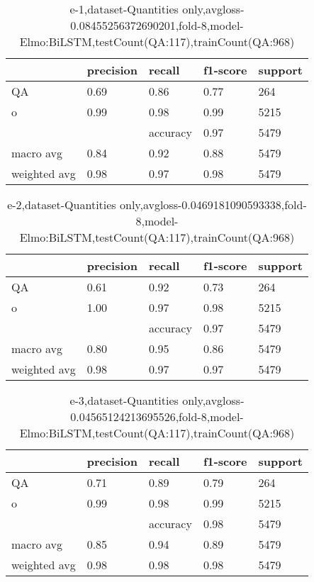 \begin{table}[!ht] 
\centering
\caption{e-1,dataset-Quantities only,avgloss-0.08455256372690201,fold-8,model-Elmo:BiLSTM,testCount(QA:117),trainCount(QA:968)}\label{e-1data-quantS.tsv}
\begin{tabularx}{300pt}{|X|X|X|X|X|}
\hline
&precision&recall&f1-score&support\\
\hline
QA&0.69&0.86&0.77&264\\
\hline
o&0.99&0.98&0.99&5215\\
\hline
&&accuracy&0.97&5479\\
\hline
macro avg&0.84&0.92&0.88&5479\\
\hline
weighted avg&0.98&0.97&0.98&5479\\
\hline
\end{tabularx}
\end{table}
\begin{table}[!ht] 
\centering
\caption{e-2,dataset-Quantities only,avgloss-0.0469181090593338,fold-8,model-Elmo:BiLSTM,testCount(QA:117),trainCount(QA:968)}\label{e-2data-quantS.tsv}
\begin{tabularx}{300pt}{|X|X|X|X|X|}
\hline
&precision&recall&f1-score&support\\
\hline
QA&0.61&0.92&0.73&264\\
\hline
o&1.00&0.97&0.98&5215\\
\hline
&&accuracy&0.97&5479\\
\hline
macro avg&0.80&0.95&0.86&5479\\
\hline
weighted avg&0.98&0.97&0.97&5479\\
\hline
\end{tabularx}
\end{table}
\begin{table}[!ht] 
\centering
\caption{e-3,dataset-Quantities only,avgloss-0.04565124213695526,fold-8,model-Elmo:BiLSTM,testCount(QA:117),trainCount(QA:968)}\label{e-3data-quantS.tsv}
\begin{tabularx}{300pt}{|X|X|X|X|X|}
\hline
&precision&recall&f1-score&support\\
\hline
QA&0.71&0.89&0.79&264\\
\hline
o&0.99&0.98&0.99&5215\\
\hline
&&accuracy&0.98&5479\\
\hline
macro avg&0.85&0.94&0.89&5479\\
\hline
weighted avg&0.98&0.98&0.98&5479\\
\hline
\end{tabularx}
\end{table}
